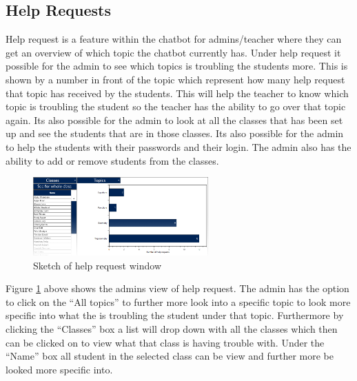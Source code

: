 \subsection{Help Requests}

Help request is a feature within the chatbot for admins/teacher where they can get an overview of which topic the chatbot currently has.
Under help request it possible for the admin to see which topics is troubling the students more. This is shown by a number in front of the topic which represent how many help request that topic has received by the students. This will help the teacher to know which topic is troubling the student so the teacher has the ability to go over that topic again.
Its also possible for the admin to look at all the classes that has been set up and see the students that are in those classes. Its also possible for the admin to help the students with their passwords and their login.
The admin also has the ability to add or remove students from the classes.

\begin{figure}[H]
    \centering
    \includegraphics[width=0.6\textwidth]{figures/HelpRequest.png}
    \caption{Sketch of help request window}
    \label{fig:HelpRequest}
\end{figure}

\noindent
Figure \ref{fig:HelpRequest} above shows the admins view of help request. The admin has the option to click on the \enquote{All topics} to further more look into a specific topic to look more specific into what the is troubling the student under that topic.
Furthermore by clicking the \enquote{Classes} box a list will drop down with all the classes which then can be clicked on to view what that class is having trouble with.
Under the \enquote{Name} box all student in the selected class can be view and further more be looked more specific into.
